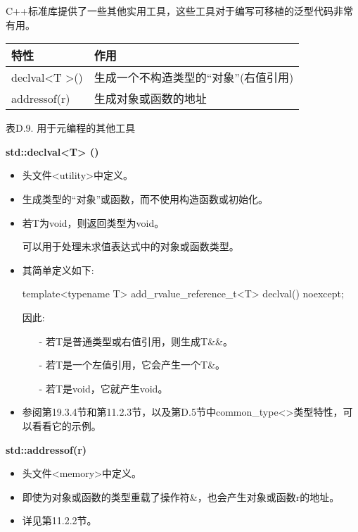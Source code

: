

C++标准库提供了一些其他实用工具，这些工具对于编写可移植的泛型代码非常有用。

\begin{table}[H]
	\begin{center}
	\begin{tabular}{l|l}
		\hline
		\textbf{特性}                       & \textbf{作用}                                                         \\ \hline
		declval\textless{}T \textgreater{}() & 生成一个不构造类型的“对象”(右值引用) \\ \hline
		addressof(r)                         & 生成对象或函数的地址                             \\ \hline
	\end{tabular}
	\end{center}
\end{table}

\begin{center}
表D.9. 用于元编程的其他工具
\end{center}

\textbf{std::declval<T> ()}

\begin{itemize}
\item 
头文件<utility>中定义。

\item 
生成类型的“对象”或函数，而不使用构造函数或初始化。

\item 
若T为void，则返回类型为void。

可以用于处理未求值表达式中的对象或函数类型。

\item 
其简单定义如下:
\begin{cpp}
template<typename T>
add_rvalue_reference_t<T> declval() noexcept;
\end{cpp}

因此:

\begin{itemize}
\item[-]
若T是普通类型或右值引用，则生成T\&\&。

\item[-]
若T是一个左值引用，它会产生一个T\&。

\item[-]
若T是void，它就产生void。
\end{itemize}

\item 
参阅第19.3.4节和第11.2.3节，以及第D.5节中common\_type<>类型特性，可以看看它的示例。
\end{itemize}

\textbf{std::addressof(r)}

\begin{itemize}
\item
头文件<memory>中定义。

\item
即使为对象或函数的类型重载了操作符\&，也会产生对象或函数r的地址。

\item
详见第11.2.2节。
\end{itemize}



















